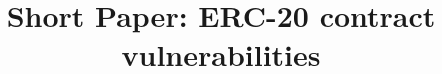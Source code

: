 \documentclass[compsoc,conference,a4paper,10pt,times]{IEEEtran}
\newcommand{\sys}{\textsf{TokenHook}\xspace}
\newcommand{\erc}{ERC-20\xspace}
\begin{document}
\title{Short Paper: \erc contract vulnerabilities}
\author{
	\IEEEauthorblockN{}
	\IEEEauthorblockA{}
}

\maketitle
\IEEEpubidadjcol

\IEEEpeerreviewmaketitle






{\footnotesize}
\appendices



\end{document}

